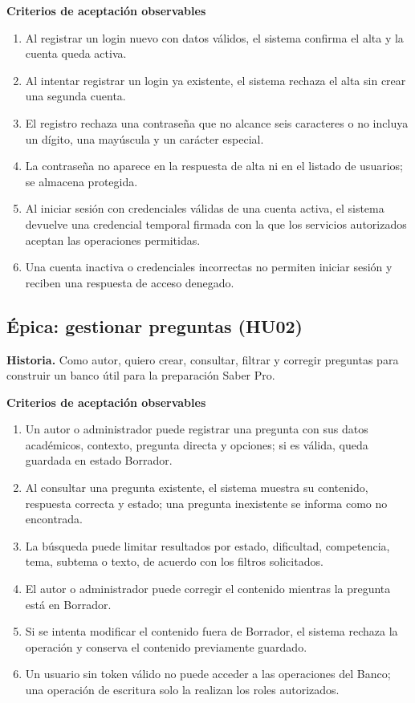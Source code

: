 \documentclass[12pt,a4paper]{article}
\begin{document}
\textbf{Criterios de aceptación observables}
\begin{enumerate}[leftmargin=*]
\item Al registrar un login nuevo con datos válidos, el sistema confirma el alta y la cuenta queda activa.
\item Al intentar registrar un login ya existente, el sistema rechaza el alta sin crear una segunda cuenta.
\item El registro rechaza una contraseña que no alcance seis caracteres o no incluya un dígito, una mayúscula y un carácter especial.
\item La contraseña no aparece en la respuesta de alta ni en el listado de usuarios; se almacena protegida.
\item Al iniciar sesión con credenciales válidas de una cuenta activa, el sistema devuelve una credencial temporal firmada con la que los servicios autorizados aceptan las operaciones permitidas.
\item Una cuenta inactiva o credenciales incorrectas no permiten iniciar sesión y reciben una respuesta de acceso denegado.
\end{enumerate}

\subsection{Épica: gestionar preguntas (HU02)}
\textbf{Historia.} Como autor, quiero crear, consultar, filtrar y corregir preguntas para construir un banco útil para la preparación Saber Pro.

\textbf{Criterios de aceptación observables}
\begin{enumerate}[leftmargin=*]
\item Un autor o administrador puede registrar una pregunta con sus datos académicos, contexto, pregunta directa y opciones; si es válida, queda guardada en estado Borrador.
\item Al consultar una pregunta existente, el sistema muestra su contenido, respuesta correcta y estado; una pregunta inexistente se informa como no encontrada.
\item La búsqueda puede limitar resultados por estado, dificultad, competencia, tema, subtema o texto, de acuerdo con los filtros solicitados.
\item El autor o administrador puede corregir el contenido mientras la pregunta está en Borrador.
\item Si se intenta modificar el contenido fuera de Borrador, el sistema rechaza la operación y conserva el contenido previamente guardado.
\item Un usuario sin token válido no puede acceder a las operaciones del Banco; una operación de escritura solo la realizan los roles autorizados.
\end{enumerate}
\end{document}
